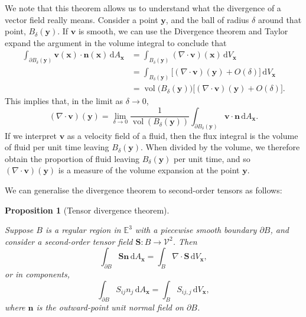 \documentclass[
  letterpaper,
  DIV=11,
  numbers=noendperiod]{scrreprt}
\theoremstyle{plain}
\newtheorem{proposition}{Proposition}[chapter]
\theoremstyle{remark}
\begin{document}
We note that this theorem allows us to understand what the divergence of
a vector field really means. Consider a point \({\boldsymbol{y}}\), and
the ball of radius \(\delta\) around that point,
\(B_\delta({\boldsymbol{y}})\). If \({\boldsymbol{v}}\) is smooth, we
can use the Divergence theorem and Taylor expand the argument in the
volume integral to conclude that \[\begin{aligned}
  \int_{\partial B_\delta({\boldsymbol{y}})}{\boldsymbol{v}}({\boldsymbol{x}})\cdot{\boldsymbol{n}}({\boldsymbol{x}}){\,{\mathrm{d}}A_{{\boldsymbol{x}}}}
  &= \int_{B_\delta({\boldsymbol{y}})}(\nabla \cdot {\boldsymbol{v}})({\boldsymbol{x}}){\,{\mathrm{d}}V_{{\boldsymbol{x}}}}\\
  &= \int_{B_\delta({\boldsymbol{y}})}\big[(\nabla \cdot {\boldsymbol{v}})({\boldsymbol{y}})+{O}(\delta)\big]{\,{\mathrm{d}}V_{{\boldsymbol{x}}}}\\
  &= {\operatorname{vol}}\big(B_\delta({\boldsymbol{y}})\big)\big[(\nabla \cdot {\boldsymbol{v}})({\boldsymbol{y}})+{O}(\delta)\big].
\end{aligned}\] This implies that, in the limit as \(\delta\to0\),
\[(\nabla \cdot {\boldsymbol{v}})({\boldsymbol{y}}) = \lim_{\delta\to0}\frac{1}{{\operatorname{vol}}(B_\delta({\boldsymbol{y}}))}\int_{\partial B_\delta({\boldsymbol{y}})}{\boldsymbol{v}}\cdot{\boldsymbol{n}}{\,{\mathrm{d}}A_{{\boldsymbol{x}}}}.\]
If we interpret \({\boldsymbol{v}}\) as a velocity field of a fluid,
then the flux integral is the volume of fluid per unit time leaving
\(B_\delta({\boldsymbol{y}})\). When divided by the volume, we therefore
obtain the proportion of fluid leaving \(B_\delta({\boldsymbol{y}})\)
per unit time, and so
\((\nabla\cdot{\boldsymbol{v}})({\boldsymbol{y}})\) is a measure of the
volume expansion at the point \({\boldsymbol{y}}\).

We can generalise the divergence theorem to second-order tensors as
follows:

\begin{proposition}[Tensor divergence
theorem]\protect\hypertarget{prp-tensordivthm}{}\label{prp-tensordivthm}

Suppose \(B\) is a regular region in \({\mathbb{E}}^3\) with a piecewise
smooth boundary \(\partial B\), and consider a second-order tensor field
\({\boldsymbol{S}}:B\to{\mathcal{V}}^2\). Then
\[\int_{\partial B} {\boldsymbol{S}}{\boldsymbol{n}}{\,{\mathrm{d}}A_{{\boldsymbol{x}}}}= \int_B\nabla\cdot{\boldsymbol{S}}{\,{\mathrm{d}}V_{{\boldsymbol{x}}}},\]
or in components,
\[\int_{\partial B}S_{ij}n_j {\,{\mathrm{d}}A_{{\boldsymbol{x}}}}= \int_BS_{ij,j} {\,{\mathrm{d}}V_{{\boldsymbol{x}}}},\]
where \({\boldsymbol{n}}\) is the outward-point unit normal field on
\(\partial B\).

\end{proposition}
\end{document}
